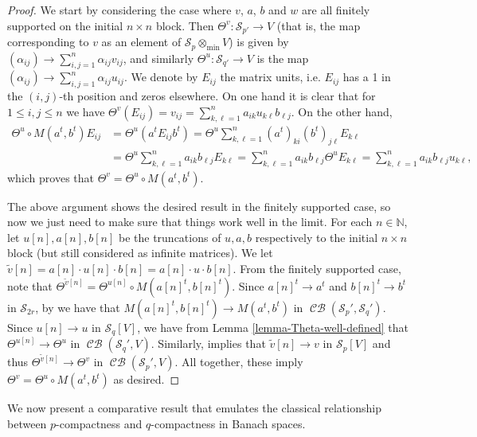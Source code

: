 \documentclass[11pt]{amsart}
\DeclareMathOperator{\CB}{\mathcal{CB}}
\newcommand{\N}{{\mathbb{N}}}
\numberwithin{equation}{section}
\begin{document}
\begin{proof}
We start by considering the case where $v$, $a$, $b$ and $w$ are all finitely supported on the initial $n \times n$ block.
Then $\Theta^v : \mathcal{S}_{p'} \to V$ (that is, the map corresponding to $v$ as an element of $\mathcal{S}_p \otimes_{\min} V$) is given by $(\alpha_{ij}) \to \sum_{i,j=1}^n \alpha_{ij}v_{ij}$, and similarly $\Theta^u : \mathcal{S}_{q'} \to V$ is the map $(\alpha_{ij}) \to \sum_{i,j=1}^n \alpha_{ij}u_{ij}$.
We denote by $E_{ij}$ the matrix units, i.e. $E_{ij}$ has a 1 in the $(i,j)$-th position and zeros elsewhere.
On one hand it is clear that for $1\le i, j \le n$ we have $\Theta^v(E_{ij}) = v_{ij} = \sum_{k,\ell=1}^n a_{ik} u_{k\ell} b_{\ell j}$.
On the other hand,
\begin{align*}
\Theta^u \circ M(a^t, b^t) E_{ij} &  = \Theta^u(a^t E_{ij} b^t) = \Theta^u \sum_{k,\ell=1}^n (a^t)_{ki} (b^t)_{j\ell} E_{k \ell} \\
& = \Theta^u \sum_{k,\ell=1}^n a_{ik} b_{\ell j} E_{k \ell} 
= \sum_{k,\ell=1}^n a_{ik} b_{\ell j} \Theta^uE_{k \ell} = \sum_{k,\ell=1}^n a_{ik} b_{\ell j} u_{k \ell},
\end{align*}
which proves that $\Theta^v = \Theta^u \circ M(a^t, b^t)$.


The above argument shows the desired result in the finitely supported case, so now we just need to make sure that things work well in the limit.
For each $n\in\N$, let $u[n],a[n],b[n]$ be the truncations of $u, a, b$ respectively to the initial $n\times n$ block (but still considered as infinite matrices). We let $\widetilde{v}[n] = a[n]\cdot u[n] \cdot b[n] = a[n] \cdot u \cdot b[n]$.
From the finitely supported case, note that
$\Theta^{\widetilde{v}[n]} = \Theta^{u[n]} \circ M(a[n]^t,b[n]^t)$.
Since $a[n]^t \to a^t$ and $b[n]^t \to b^t$ in $\mathcal{S}_{2r}$, by \cite[Lem. 2.4]{Oikhberg} we have that $M(a[n]^t,b[n]^t) \to M(a^t,b^t)$
 in $\CB(\mathcal{S}_p',\mathcal{S}_q')$.
 Since $u[n] \to u$ in $\mathcal{S}_q[V]$, we have from Lemma \ref{lemma-Theta-well-defined} that $\Theta^{u[n]} \to \Theta^u$ in $\CB(\mathcal{S}_q',V)$.
 Similarly,  \cite[Thm. 1.5]{Pisier-Asterisque} implies that $\widetilde{v}[n] \to v$ in $\mathcal{S}_p[V]$ and thus $\Theta^{\widetilde{v}[n]} \to \Theta^v$ in $\CB(\mathcal{S}_p',V)$. All together, these imply  $\Theta^v = \Theta^u \circ M(a^t, b^t)$ as desired.
 \end{proof}


We now present a comparative result that emulates the classical relationship between  $p$-compactness and $q$-compactness in Banach spaces.
\end{document}
